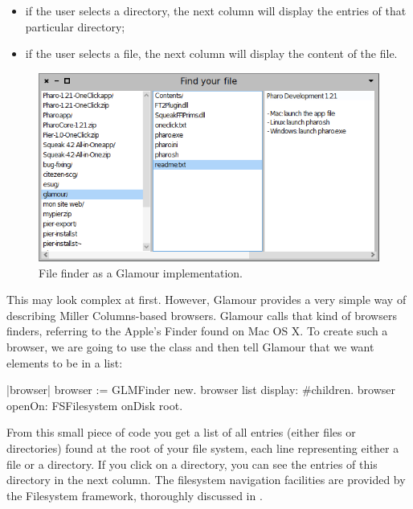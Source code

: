 \documentclass[a4paper,10pt,twoside]{book}
\begin{document}
\begin{itemize}
\item if the user selects a directory, the next column will display
  the entries of that particular directory;
\item if the user selects a file, the next column will display the
  content of the file.
\end{itemize}

\begin{figure}
  \begin{center}
    \includegraphics[scale=0.48]{cs_file_finder_final}
    \caption{File finder as a Glamour
      implementation. \label{fig:casestudies/file_finder}}
  \end{center}
\end{figure}

This may look complex at first. However, Glamour provides a very
simple way of describing Miller Columns-based browsers. Glamour calls
that kind of browsers finders, referring to the Apple's Finder found
on Mac OS X. To create such a browser, we are going to use the
 class and then tell Glamour that we want elements
to be in a list:

\begin{code}{}
|browser|
browser := GLMFinder new.
browser list
	display: #children.
browser openOn: FSFilesystem onDisk root.
\end{code}

From this small piece of code you get a list of all entries (either
files or directories) found at the root of your file system, each line
representing either a file or a directory. If you click on a
directory, you can see the entries of this directory in the next
column. The filesystem navigation facilities are provided by the
Filesystem framework, thoroughly discussed in .
\end{document}
